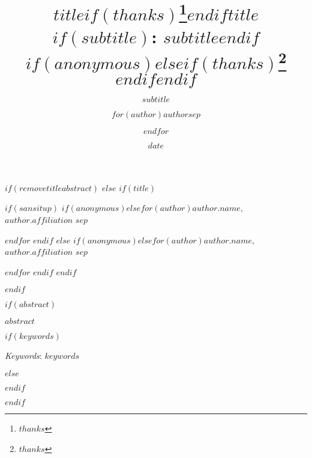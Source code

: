 \documentclass[
  $if(fontsize)$
    $fontsize$,
  $endif$
    $if(lang)$
    $babel-lang$,
  $endif$
    $if(papersize)$
    $papersize$paper,
  $endif$
    $if(beamer)$
    ignorenonframetext,
  $if(handout)$
    handout,
  $endif$
    $if(aspectratio)$
    aspectratio=$aspectratio$,
  $endif$
    $endif$
    $for(classoption)$
    $classoption$$sep$,
  $endfor$
    ]{$documentclass$}
\title{$title$$if(thanks)$\thanks{$thanks$}$endif$}
\subtitle{$subtitle$}
\author{$for(author)$$author$$sep$ \and $endfor$}
\date{$date$}
\institute{$for(institute)$$institute$$sep$ \and $endfor$}
\title{$title$$if(subtitle)$: $subtitle$$endif$$if(anonymous)$$else$$if(thanks)$\thanks{$thanks$} $endif$$endif$ }
\date{}
\renewenvironment{abstract}
                  {{%
                    \setlength{\leftmargin}{0mm}
                    \setlength{\rightmargin}{\leftmargin}%
                  }%
                    \relax}
                  {\endlist}
\begin{document}


$if(removetitleabstract)$
$else$
$if(title)$

{%
\setlength{\parindent}{0pt}
\thispagestyle{plain}
{%
\maketitle  %

}




{
   \vskip 13.5pt\relax \normalsize\fontsize{11}{12} 
   $if(sansitup)$
$if(anonymous)$\hfill $else$$for(author)$\MakeUppercase{\textsf{\large $author.name$}}, \small{$author.affiliation$}  $sep$ \par $endfor$ $endif$
$else$
$if(anonymous)$\hfill $else$$for(author)$\MakeUppercase{$author.name$}, \small{$author.affiliation$}  $sep$ \par \vskip -3.5pt $endfor$ $endif$
$endif$

}

}


$endif$



$if(abstract)$



\begin{abstract}


    \vskip 8.5pt %

\noindent \small{$abstract$}

$if(keywords)$

\vskip 8.5pt \noindent \emph{Keywords}: $keywords$ \par



$else$


$endif$

\end{abstract}

$endif$

\vskip -8.5pt
\end{document}
